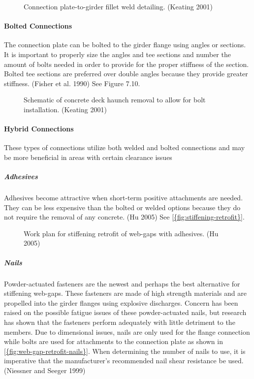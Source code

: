 \begin{figure}
  \caption{Connection plate-to-girder fillet weld detailing. (Keating 2001)}
  \label{fig:plate-to-girder-fillet-weld}
\end{figure}

\paragraph{Bolted Connections}
The connection plate can be bolted to the girder flange using angles or sections. It is important to properly size
the angles and tee sections and number the amount of bolts needed in order to provide for the proper stiffness of the
section. Bolted tee sections are preferred over double angles because they provide greater stiffness. (Fisher et al.
1990) See Figure 7.10.

\begin{figure}
  \caption{Schematic of concrete deck haunch removal to allow for bolt installation. (Keating 2001)}
  \label{fig:concrete-dec-haunch-removeal}
\end{figure}

\paragraph{Hybrid Connections}
These types of connections utilize both welded and bolted connections and may be more beneficial in areas with certain clearance issues
\subparagraph{Adhesives}
Adhesives become attractive when short-term positive attachments are needed. They can be less expensive than
the bolted or welded options because they do not require the removal of any concrete. (Hu 2005) See \cref{{fig:stiffening-retrofit}}.

\begin{figure}
  \caption{Work plan for stiffening retrofit of web-gaps with adhesives. (Hu 2005)}
  \label{fig:stiffening-retrofit}
\end{figure}

\subparagraph{Nails}
Powder-actuated fasteners are the newest and perhaps the best alternative for stiffening web-gaps. These
fasteners are made of high strength materials and are propelled into the girder flanges using explosive discharges.
Concern has been raised on the possible fatigue issues of these powder-actuated nails, but research has shown that the
fasteners perform adequately with little detriment to the members. Due to dimensional issues, nails are only used for
the flange connection while bolts are used for attachments to the connection plate as shown in \cref{{fig:web-gap-retrofit-nails}}. When
determining the number of nails to use, it is imperative that the manufacturer’s recommended nail shear resistance be
used. (Niessner and Seeger 1999)

